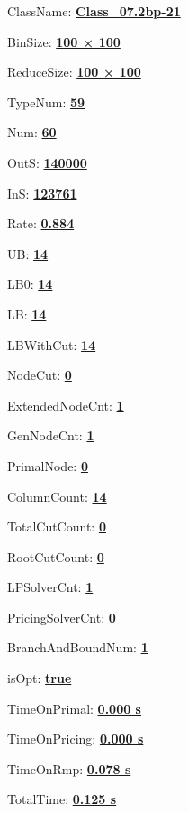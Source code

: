 \documentclass[11pt]{article}
\begin{document}
\pagestyle{empty}


ClassName: \underline{\textbf{Class_07.2bp-21}}
\par
BinSize: \underline{\textbf{100 × 100}}
\par
ReduceSize: \underline{\textbf{100 × 100}}
\par
TypeNum: \underline{\textbf{59}}
\par
Num: \underline{\textbf{60}}
\par
OutS: \underline{\textbf{140000}}
\par
InS: \underline{\textbf{123761}}
\par
Rate: \underline{\textbf{0.884}}
\par
UB: \underline{\textbf{14}}
\par
LB0: \underline{\textbf{14}}
\par
LB: \underline{\textbf{14}}
\par
LBWithCut: \underline{\textbf{14}}
\par
NodeCut: \underline{\textbf{0}}
\par
ExtendedNodeCnt: \underline{\textbf{1}}
\par
GenNodeCnt: \underline{\textbf{1}}
\par
PrimalNode: \underline{\textbf{0}}
\par
ColumnCount: \underline{\textbf{14}}
\par
TotalCutCount: \underline{\textbf{0}}
\par
RootCutCount: \underline{\textbf{0}}
\par
LPSolverCnt: \underline{\textbf{1}}
\par
PricingSolverCnt: \underline{\textbf{0}}
\par
BranchAndBoundNum: \underline{\textbf{1}}
\par
isOpt: \underline{\textbf{true}}
\par
TimeOnPrimal: \underline{\textbf{0.000 s}}
\par
TimeOnPricing: \underline{\textbf{0.000 s}}
\par
TimeOnRmp: \underline{\textbf{0.078 s}}
\par
TotalTime: \underline{\textbf{0.125 s}}
\par
\newpage


\end{document}
